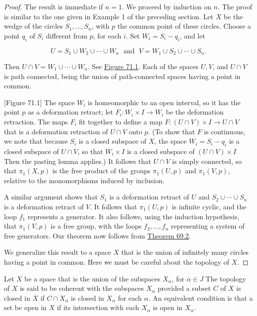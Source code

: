 \begin{proof}
The result is immediate if \(n = 1\). We proceed by induction on \(n\). The proof is similar to the one given in Example 1 of the preceding section.
Let \(X\) be the wedge of the circles \(S_{1},\ldots ,S_{n}\), with \(p\) the common point of these circles. Choose a point \(q_{i}\) of \(S_{i}\) different from \(p\), for each \(i\). Set \(W_{i} = S_{i} - q_{i}\), and let

\[
U = S_{1} \cup {W}_{2} \cup \cdots \cup {W}_{n}\;\text{ and }\;V = W_{1} \cup {S}_{2} \cup \cdots \cup {S}_{n}.
\]

Then \(U \cap V = W_{1} \cup \cdots \cup {W}_{n}\). See \hyperref[fig:71.1]{Figure 71.1}. Each of the spaces \(U,V\), and \(U \cap V\) is path connected, being the union of path-connected spaces having a point in common.

[Figure 71.1]
The space \(W_{i}\) is homeomorphic to an open interval, so it has the point \(p\) as a deformation retract; let \(F_{i} : W_{i} \times I \rightarrow {W}_{i}\) be the deformation retraction. The maps \(F_{i}\) fit together to define a map \(F : ( {U \cap V}) \times I \rightarrow U \cap V\) that is a deformation retraction of \(U \cap V\) onto \(p\). (To show that \(F\) is continuous, we note that because \(S_{i}\) is a closed subspace of \(X\), the space \(W_{i} = S_{i} - q_{i}\) is a closed subspace of \(U \cap V\), so that \(W_{i} \times I\) is a closed subspace of \(( {U \cap V}) \times I\) Then the pasting lemma applies.) It follows that \(U \cap V\) is simply connected, so that \({\pi }_{1}( {X,p})\) is the free product of the groups \({\pi }_{1}( {U,p})\) and \({\pi }_{1}( {V,p})\), relative to the monomorphisms induced by inclusion.

A similar argument shows that \(S_{1}\) is a deformation retract of \(U\) and \(S_{2} \cup \cdots \cup {S}_{n}\) is a deformation retract of \(V\). It follows that \({\pi }_{1}( {U,p})\) is infinite cyclic, and the loop \(f_{1}\) represents a generator. It also follows, using the induction hypothesis, that \({\pi }_{1}( {V,p})\) is a free group, with the loops \(f_{2},\ldots ,f_{n}\) representing a system of free generators. Our theorem now follows from \hyperref[thm:69.2]{Theorem 69.2}.

We generalize this result to a space \(X\) that is the union of infinitely many circles having a point in common. Here we must be careful about the topology of \(X\).
\end{proof}
\begin{definition}
Let \(X\) be a space that is the union of the subspaces \(X_{\alpha }\), for \(\alpha \in J\) The topology of \(X\) is said to be coherent with the subspaces \(X_{\alpha }\) provided a subset \(C\) of \(X\) is closed in \(X\) if \(C \cap {X}_{\alpha }\) is closed in \(X_{\alpha }\) for each \(\alpha\). An equivalent condition is that a set be open in \(X\) if its intersection with each \(X_{\alpha }\) is open in \(X_{\alpha }\).
\end{definition}

